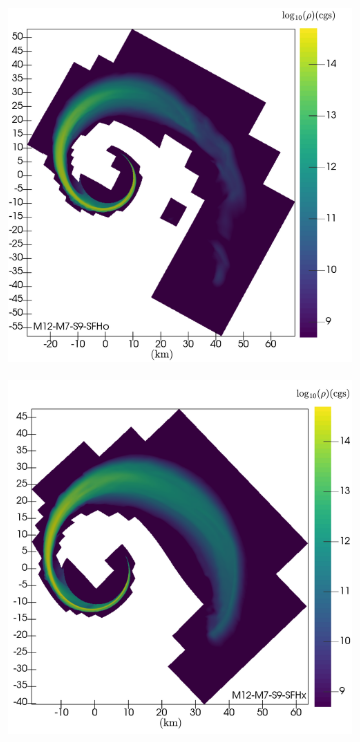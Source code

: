 \begin{figure}
\begin{subfigure}[b]{0.475\textwidth}
		\label{fig:rho_M12_FSU21}
	\centering
	\end{subfigure}
	\begin{subfigure}[b]{0.475\textwidth}
		\centering
		\includegraphics[width=\linewidth]{images/rho_SFHo_M12-merger-inertial}
		\label{fig:rho_M12_SFHo}
	\end{subfigure}
	\begin{subfigure}[b]{0.475\textwidth}
		\centering
		\includegraphics[width=\linewidth]{images/rho_SFHx_M12-merger-inertial}

\end{subfigure}
\end{figure}
